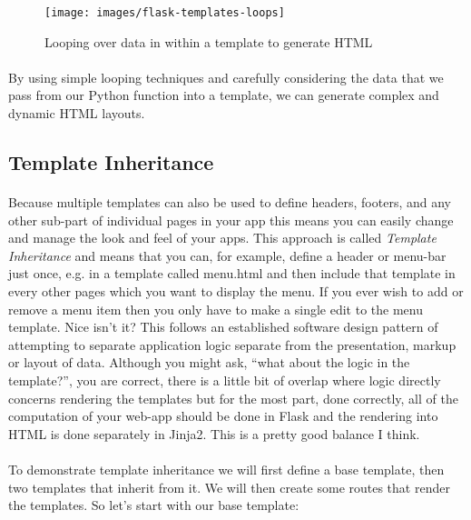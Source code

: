 \documentclass[12pt, a4paper, oneside]{book}
\begin{document}
\begin{figure}[H]
\centering
\texttt{[image: images/flask-templates-loops]}
\caption{Looping over data in within a template to generate HTML}
\label{fig:flask-templates-loops}
\end{figure}

\paragraph{} By using simple looping techniques and carefully considering the data that we pass from our Python function into a template, we can generate complex and dynamic HTML layouts.


\subsection{Template Inheritance}
\label{template-inheritance}
\paragraph{} Because multiple templates can also be used to define headers, footers, and any other sub-part of individual pages in your app this means you can easily change and manage the look and feel of your apps. This approach is called \emph{Template Inheritance} and means that you can, for example, define a header or menu-bar just once, e.g. in a template called menu.html and then include that template in every other pages which you want to display the menu. If you ever wish to add or remove a menu item then you only have to make a single edit to the menu template. Nice isn't it? This follows an established software design pattern of attempting to separate application logic separate from the presentation, markup or layout of data. Although you might ask, ``what about the logic in the template?'', you are correct, there is a little bit of overlap where logic directly concerns rendering the templates but for the most part, done correctly, all of the computation of your web-app should be done in Flask and the rendering into HTML is done separately in Jinja2. This is a pretty good balance I think.

\paragraph{} To demonstrate template inheritance we will first define a base template, then two templates that inherit from it. We will then create some routes that render the templates. So let's start with our base template:
\end{document}
